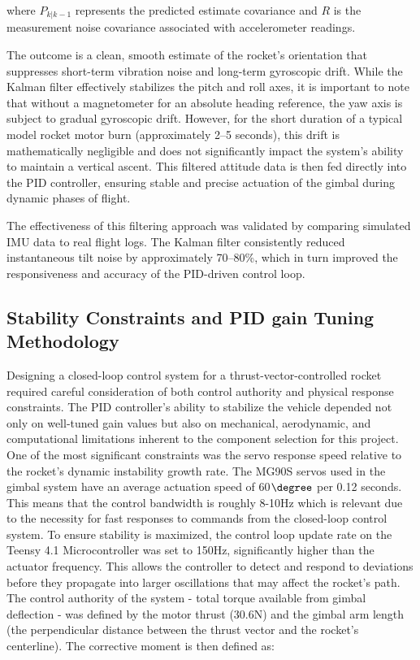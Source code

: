 where $P_{k|k-1}$ represents the predicted estimate covariance and $R$ is the measurement noise covariance associated with accelerometer readings.  

The outcome is a clean, smooth estimate of the rocket’s orientation that suppresses short-term vibration noise and long-term gyroscopic drift. While the Kalman filter effectively stabilizes the pitch and roll axes, it is important to note that without a magnetometer for an absolute heading reference, the yaw axis is subject to gradual gyroscopic drift. However, for the short duration of a typical model rocket motor burn (approximately 2–5 seconds), this drift is mathematically negligible and does not significantly impact the system's ability to maintain a vertical ascent. This filtered attitude data is then fed directly into the PID controller, ensuring stable and precise actuation of the gimbal during dynamic phases of flight.  

The effectiveness of this filtering approach was validated by comparing simulated IMU data to real flight logs. The Kalman filter consistently reduced instantaneous tilt noise by approximately 70–80\%, which in turn improved the responsiveness and accuracy of the PID-driven control loop.

\subsection{Stability Constraints and PID gain Tuning Methodology}

Designing a closed-loop control system for a thrust-vector-controlled rocket required careful consideration of both control authority and physical response constraints. The PID controller’s ability to stabilize the vehicle depended not only on well-tuned gain values but also on mechanical, aerodynamic, and computational limitations inherent to the component selection for this project. 
One of the most significant constraints was the servo response speed relative to the rocket’s dynamic instability growth rate. The MG90S servos used in the gimbal system have an average actuation speed of 60$\degree$ per 0.12 seconds. This means that the control bandwidth is roughly 8-10Hz which is relevant due to the necessity for fast responses to commands from the closed-loop control system. To ensure stability is maximized, the control loop update rate on the Teensy 4.1 Microcontroller was set to 150Hz, significantly higher than the actuator frequency. This allows the controller to detect and respond to deviations before they propagate into larger oscillations that may affect the rocket’s path. 
The control authority of the system - total torque available from gimbal deflection - was defined by the motor thrust (30.6N) and the gimbal arm length (the perpendicular distance between the thrust vector and the rocket’s centerline). The corrective moment is then defined as: 

